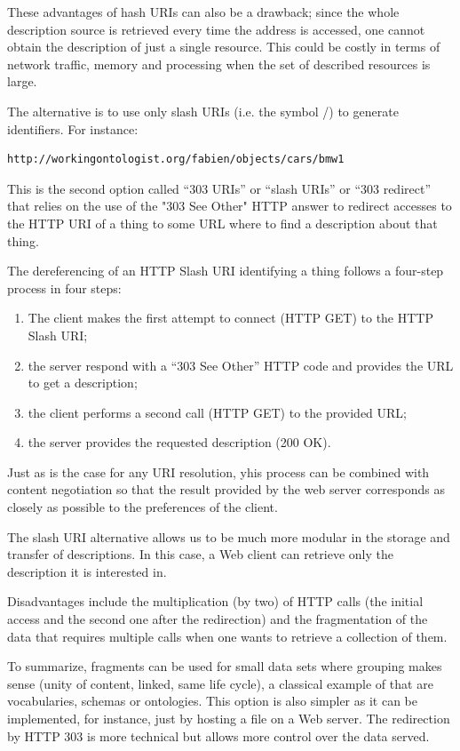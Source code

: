 These advantages of hash URIs can also be a drawback; since the whole
description source is retrieved every time the address is accessed, one
cannot obtain the description of just a  single resource.  This could 
be costly in terms of network traffic, memory and processing
when the set of described resources is large.

The alternative is to use only slash URIs (i.e. the symbol /) 
to generate identifiers. For instance:

\begin{lstlisting}
http://workingontologist.org/fabien/objects/cars/bmw1
\end{lstlisting}


This is the second option called ``303 URIs'' or ``slash URIs'' or ``303
redirect'' that relies on the use of the "303 See Other" HTTP answer to
redirect accesses to the HTTP URI of a thing to some URL where to find a
description about that thing.

The dereferencing of an HTTP Slash URI identifying a thing follows  a four-step 
process in four steps: 
\begin{enumerate}
    \item The client makes the first
attempt to connect (HTTP GET) to the HTTP Slash URI; 
    \item the server
respond with a ``303 See Other'' HTTP code and provides the URL to get a
description;
    \item the client performs a second call (HTTP GET) to the
provided URL;
    \item the server provides the requested description (200
OK).
\end{enumerate}

Just as is the case for any URI resolution, yhis process can be combined with 
content negotiation so that
the result provided by the web server corresponds as closely as possible to the preferences
of the client.

The slash URI alternative allows us to be much more modular in
the storage and transfer of descriptions. In this case, a Web client can
retrieve only the description it is interested in.

Disadvantages include the multiplication (by two) of HTTP calls (the
initial access and the second one after the redirection) and the
fragmentation of the data that requires multiple calls when one wants to
retrieve a collection of them.

To summarize, fragments can be used for small data sets where grouping
makes sense (unity of content, linked, same life cycle), a classical
example of that are vocabularies, schemas or ontologies. This option is
also simpler as it can be implemented, for instance, just by
hosting a file on a Web server. The redirection by HTTP 303 is more
technical but allows more control over the data served.

